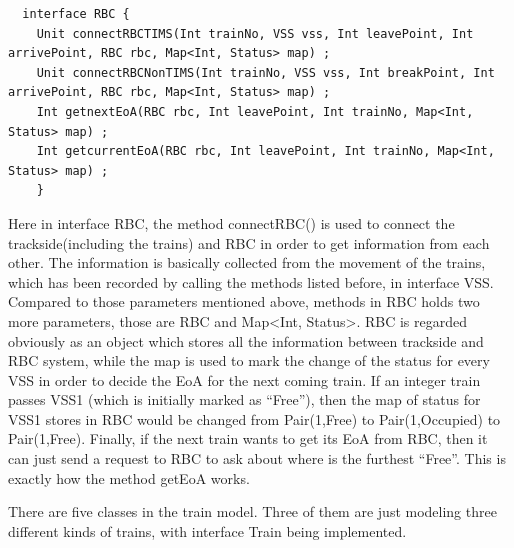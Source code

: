 \documentclass[article,dr=phil,type=msc,colorback,accentcolor=tud9c]{tudthesis}
\begin{document}
\begin{itemize}
  	\begin{lstlisting}
  interface RBC {
  	Unit connectRBCTIMS(Int trainNo, VSS vss, Int leavePoint, Int arrivePoint, RBC rbc, Map<Int, Status> map) ;
  	Unit connectRBCNonTIMS(Int trainNo, VSS vss, Int breakPoint, Int arrivePoint, RBC rbc, Map<Int, Status> map) ;
  	Int getnextEoA(RBC rbc, Int leavePoint, Int trainNo, Map<Int, Status> map) ;
  	Int getcurrentEoA(RBC rbc, Int leavePoint, Int trainNo, Map<Int, Status> map) ;
 	}\end{lstlisting}
  	
    Here in interface RBC, the method connectRBC() is used to connect the trackside(including the trains) and RBC in order to get information from each other. The information is basically collected from the movement of the trains, which has been recorded by calling the methods listed before, in interface VSS. Compared to those parameters mentioned above, methods in RBC holds two more parameters, those are RBC and Map<Int, Status>. RBC is regarded obviously as an object which stores all the information between trackside and RBC system, while the map is used to mark the change of the status for every VSS in order to decide the EoA for the next coming train. If an integer train passes VSS1 (which is initially marked as ``Free''), then the map of status for VSS1 stores in RBC would be changed from Pair(1,Free) to Pair(1,Occupied) to Pair(1,Free). Finally, if the next train wants to get its EoA from RBC, then it can just send a request to RBC to ask about where is the furthest “Free”. This is exactly how the method getEoA works.\cite{ayed2014b}

  \end{itemize}

  There are five classes in the train model. Three of them are just modeling three different kinds of trains, with interface Train being implemented.
  
\end{document}
